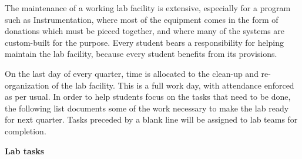 

The maintenance of a working lab facility is extensive, especially for a program such as Instrumentation, where most of the equipment comes in the form of donations which must be pieced together, and where many of the systems are custom-built for the purpose.  Every student bears a responsibility for helping maintain the lab facility, because every student benefits from its provisions.

On the last day of every quarter, time is allocated to the clean-up and re-organization of the lab facility.  This is a full work day, with attendance enforced as per usual.  In order to help students focus on the tasks that need to be done, the following list documents some of the work necessary to make the lab ready for next quarter.  Tasks preceded by a blank line will be assigned to lab teams for completion.

\vskip 10pt

\noindent
{\bf Lab tasks}

